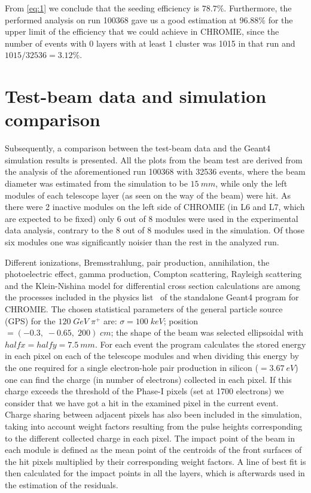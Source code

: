 \documentclass[a4paper,11pt]{article}
\begin{document}
From \eqref{eq:1} we conclude that the seeding efficiency is $78.7 \%$. Furthermore, the performed analysis on run 100368 gave us a good estimation at $96.88 \%$ for the upper limit of the efficiency that we could achieve in CHROMIE, since the number of events with 0 layers with at least 1 cluster  was 1015 in that run and $1015/32536 = 3.12 \%$.

\section{Test-beam data and simulation comparison}
Subsequently, a comparison between the test-beam data and the Geant4 simulation results is presented. All the plots from the beam test are derived from the analysis of the aforementioned run 100368 with 32536 events, where the beam diameter was estimated from the simulation to be $15\: mm$, while only the left modules of each telescope layer (as seen on the way of the beam) were hit. As there were 2 inactive modules on the left side of CHROMIE (in L6 and L7, which are expected to be fixed) only 6 out of 8 modules were used in the experimental data analysis, contrary to the 8 out of 8 modules used in the simulation. Of those six modules one was significantly noisier than the rest in the analyzed run.

Different ionizations, Bremsstrahlung, pair production, annihilation, the photoelectric effect, gamma production, Compton scattering, Rayleigh scattering and the Klein-Nishina model for differential cross section calculations are among the processes included in the physics list~\cite{j} of the standalone Geant4 program for CHROMIE. The chosen statistical parameters of the general particle source (GPS) for the $120\; GeV\; \pi^{+}$ are: $\sigma = 100\; keV$; position $= (-0.3,\; -0.65,\; 200)\; cm$; the shape of the beam was selected ellipsoidal with $halfx = halfy = 7.5\: mm$. For each event the program calculates the stored energy in each pixel on each of the telescope modules and when dividing this energy by the one required for a single electron-hole pair production in silicon ($= 3.67\: eV$) one can find the charge (in number of electrons) collected in each pixel. If this charge exceeds the threshold of the Phase-I pixels (set at 1700 electrons) we consider that we have got a hit in the examined pixel in the current event. Charge sharing between adjacent pixels has also been included in the simulation, taking into account weight factors resulting from the pulse heights corresponding to the different collected charge in each pixel. The impact point of the beam in each module is defined as the mean point of the centroids of the front surfaces of the hit pixels multiplied by their corresponding weight factors. A line of best fit is then calculated for the impact points in all the layers, which is afterwards used in the estimation of the residuals.
\end{document}

